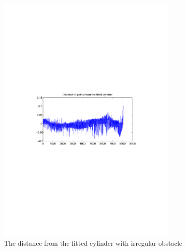 \begin{figure}[htbp]
    \centering
    \includegraphics[width=0.8\textwidth]{pics/pos1-irregular-tof-dist}
    \caption{The distance from the fitted cylinder with irregular obstacle}
    \label{chap7:fig-pos1-irregular-tof-dits}
\end{figure}
